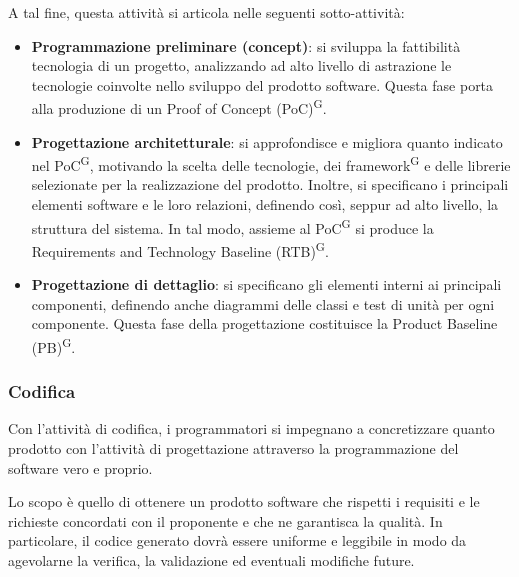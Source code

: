 A tal fine, questa attività si articola nelle seguenti sotto-attività:
\begin{itemize}
    \item \textbf{Programmazione preliminare (concept)}: si sviluppa la fattibilità tecnologia di un progetto, analizzando ad alto livello di astrazione le tecnologie coinvolte nello sviluppo del prodotto software. Questa fase porta alla produzione di un Proof of Concept (PoC)\textsuperscript{G}.
    \item \textbf{Progettazione architetturale}: si approfondisce e migliora quanto indicato nel PoC\textsuperscript{G}, motivando la scelta delle tecnologie, dei framework\textsuperscript{G} e delle librerie selezionate per la realizzazione del prodotto. Inoltre, si specificano i principali elementi software e le loro relazioni, definendo così, seppur ad alto livello, la struttura del sistema. In tal modo, assieme al PoC\textsuperscript{G} si produce la Requirements and Technology Baseline (RTB)\textsuperscript{G}.
    \item \textbf{Progettazione di dettaglio}: si specificano gli elementi interni ai principali componenti, definendo anche diagrammi delle classi e test di
    unità per ogni componente. Questa fase della progettazione costituisce la Product Baseline (PB)\textsuperscript{G}.
\end{itemize}

\subsubsection{Codifica}
Con l'attività di codifica, i programmatori si impegnano a concretizzare quanto prodotto con l'attività di progettazione attraverso la programmazione del software vero e proprio.

Lo scopo è quello di ottenere un prodotto software che rispetti i requisiti e le richieste concordati con il proponente e che ne garantisca la qualità. In particolare, il codice generato dovrà essere uniforme e leggibile in modo da agevolarne la verifica, la validazione ed eventuali modifiche future.

